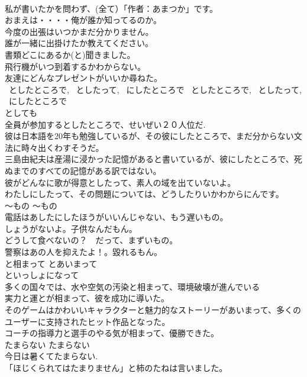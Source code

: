 \documentclass[8pt]{extreport}
\begin{document}
\begin{CJK}{UTF8}{min}
\\	私が書いたかを問わず、(全て）「作者：あまつか」です。  
\\	おまえは・・・・俺が誰か知ってるのか。  
\\	今度の出張はいつかまだ分かりません。  
\\	誰が一緒に出掛けたか教えてください。 
\\	書類どこにあるか(と)聞きました。   
\\	飛行機がいつ到着するかわからない。  
\\	友達にどんなプレゼントがいいか尋ねた。  
\\	~としたところで, ~としたって, ~にしたところで	~としたところで, ~としたって, ~にしたところで	
\\	としても	
\\	全員が参加するとしたところで、せいぜい２０人位だ.  
\\	彼は日本語を20年も勉強しているが、その彼にしたところで、まだ分からない文法に時々出くわすそうだ。  
\\	三島由紀夫は産湯に浸かった記憶があると書いているが、彼にしたところで、死ぬまでのすべての記憶がある訳ではない。  
\\	彼がどんなに歌が得意としたって、素人の域を出ていないよ。  
\\	わたしにしたって、その問題については、どうしたりいかわからにんです。  
\\	〜もの	〜もの	
\\	電話はあしたにしたほうがいいんじゃない、もう遅いもの。  
\\	しょうがないよ。子供なんだもん。   
\\	どうして食べないの？　だって、まずいもの。  
\\	警察はあの人を抑えたよ！。毀れるもん。   
\\	と相まって	とあいまって	
\\	といっしょになって	
\\	多くの国々では、水や空気の汚染と相まって、環境破壊が進んでいる  
\\	実力と運とが相まって、彼を成功に導いた。  
\\	そのゲームはかわいいキャラクターと魅力的なストーリーがあいまって、多くのユーザーに支持されたヒット作品となった。  
\\	コーチの指導力と選手のやる気が相まって、優勝できた。  
\\	たまらない	たまらない	
\\	今日は暑くてたまらない.  
\\	「ほじくられてはたまりません」と柿のたねは言いました。  

\end{CJK}
\end{document}
